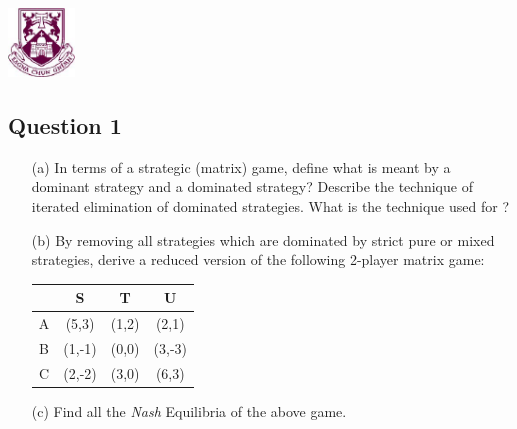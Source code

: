 \documentclass[12pt]{article}
\begin{document}
		\hspace{2.8in}\includegraphics[width=0.7in]{images/shieldtransparent2}
		\examtitle
		
		
		
		\newpage 
		
		
		\pagestyle{fancy} \setcounter{page}{1}
		\renewcommand{\headrulewidth}{0.4pt}
		\renewcommand{\headsep}{20pt}
		\lhead{\modcode \quad \modtitle \qquad \examiner} \chead{}
		\rhead{\term \setlength{\unitlength}{\baselineskip}}
		
		
		
		
		\newpage
        \subsection*{Question 1}
        \begin{enumerate}
        	
        	\item[(a)] In terms of a strategic (matrix) game, define what is meant by a dominant strategy and a dominated strategy? Describe the technique of iterated elimination of dominated strategies. What is the technique used for ? 
        	\item[(b)] By removing all strategies which are dominated by strict pure or mixed strategies, derive a reduced version of the following 2-player matrix game:
        	
        	\begin{center}
        		
        		\begin{tabular}{|c|c|c|c|}
        			\hline
        			& S        &T       & U    \\
        			\hline
        			A & (5,3) & (1,2) & (2,1) \\
        			\hline
        			B &(1,-1)& (0,0)& (3,-3) \\
        			\hline
        			C & (2,-2) & (3,0)& (6,3) \\
        			\hline
        		\end{tabular}
        		
        		
        	\end{center} 
        	
        	\item[(c)] Find all the \textit{Nash} Equilibria of the above game.
        	
        \end{enumerate}
        
\end{document}

